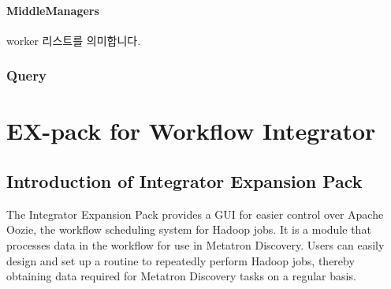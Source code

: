 \documentclass[letterpaper,10pt,english]{sphinxmanual}
\begin{document}
\subsection{MiddleManagers}
\label{\detokenize{discovery/part10/ingestion:middlemanagers}}
worker 리스트를 의미합니다.
\begin{quote}

\begin{figure}[H]
\centering

\noindent{}
\end{figure}

\begin{figure}[H]
\centering

\noindent{}
\end{figure}
\end{quote}


\section{Query}
\label{\detokenize{discovery/part10/query:query}}\label{\detokenize{discovery/part10/query::doc}}\begin{quote}

\begin{figure}[H]
\centering

\noindent{}
\end{figure}

\begin{figure}[H]
\centering

\noindent{}
\end{figure}
\end{quote}


\part{EX-pack for Workflow Integrator}
\label{\detokenize{index:ex-pack-for-workflow-integrator}}

\chapter{Introduction of Integrator Expansion Pack}
\label{\detokenize{integrator/part01/index:integrator}}\label{\detokenize{integrator/part01/index::doc}}
The Integrator Expansion Pack provides a GUI for easier control over Apache Oozie, the workflow scheduling system for Hadoop jobs. It is a module that processes data in the workflow for use in Metatron Discovery. Users can easily design and set up a routine to repeatedly perform Hadoop jobs, thereby obtaining data required for Metatron Discovery tasks on a regular basis.
\end{document}
